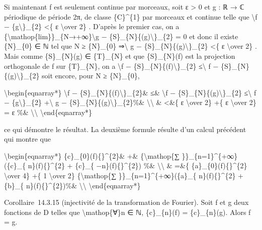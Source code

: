 \documentclass[]{article}
\begin{document}
Si maintenant f est seulement continue par morceaux, soit ε
\textgreater{} 0 et g : ℝ → ℂ périodique de période 2π, de classe
\{C\}\^{}\{1\} par morceaux et continue telle que
\textbackslash{}\textbar{}f − \{g\textbackslash{}\textbar{}\}\_\{2\}
\textless{}\{ ε \textbackslash{}over 2\} . D'après le premier cas, on a
\{\textbackslash{}mathop\{lim\}\}\_\{N→+∞\}\textbackslash{}\textbar{}g −
\{S\}\_\{N\}\{(g)\textbackslash{}\textbar{}\}\_\{2\} = 0 et donc il
existe \{N\}\_\{0\} ∈ ℕ tel que N ≥ \{N\}\_\{0\}
⇒\textbackslash{}\textbar{} g −
\{S\}\_\{N\}\{(g)\textbackslash{}\textbar{}\}\_\{2\} \textless{}\{ ε
\textbackslash{}over 2\} . Mais comme \{S\}\_\{N\}(g) ∈ \{T\}\_\{N\} et
que \{S\}\_\{N\}(f) est la projection orthogonale de f sur \{T\}\_\{N\},
on a \textbackslash{}\textbar{}f −
\{S\}\_\{N\}\{(f)\textbackslash{}\textbar{}\}\_\{2\}
≤\textbackslash{}\textbar{} f −
\{S\}\_\{N\}\{(g)\textbackslash{}\textbar{}\}\_\{2\} soit encore, pour N
≥ \{N\}\_\{0\},

\textbackslash{}begin\{eqnarray*\} \textbackslash{}\textbar{}f −
\{S\}\_\{N\}\{(f)\textbackslash{}\textbar{}\}\_\{2\}\& ≤\&
\textbackslash{}\textbar{}f −
\{S\}\_\{N\}\{(g)\textbackslash{}\textbar{}\}\_\{2\}
≤\textbackslash{}\textbar{} f − \{g\textbackslash{}\textbar{}\}\_\{2\}
+\textbackslash{}\textbar{} g −
\{S\}\_\{N\}\{(g)\textbackslash{}\textbar{}\}\_\{2\}\%\&
\textbackslash{}\textbackslash{} \& \textless{}\&\{ ε
\textbackslash{}over 2\} +\{ ε \textbackslash{}over 2\} = ε \%\&
\textbackslash{}\textbackslash{} \textbackslash{}end\{eqnarray*\}

ce qui démontre le résultat. La deuxième formule résulte d'un calcul
précédent qui montre que

\textbackslash{}begin\{eqnarray*\}
\textbar{}\{c\}\_\{0\}(f)\{\textbar{}\}\^{}\{2\}\& +\&
\{\textbackslash{}mathop\{∑ \}\}\_\{n=1\}\^{}\{+∞\}(\textbar{}\{c\}\_\{
n\}(f)\{\textbar{}\}\^{}\{2\} + \textbar{}\{c\}\_\{
−n\}(f)\{\textbar{}\}\^{}\{2\}) \%\& \textbackslash{}\textbackslash{} \&
=\&\{ \textbar{}\{a\}\_\{0\}(f)\{\textbar{}\}\^{}\{2\}
\textbackslash{}over 4\} +\{ 1 \textbackslash{}over 2\}
\{\textbackslash{}mathop\{∑ \}\}\_\{n=1\}\^{}\{+∞\}(\textbar{}\{a\}\_\{
n\}(f)\{\textbar{}\}\^{}\{2\} + \textbar{}\{b\}\_\{
n\}(f)\{\textbar{}\}\^{}\{2\})\%\& \textbackslash{}\textbackslash{}
\textbackslash{}end\{eqnarray*\}

Corollaire~14.3.15 (injectivité de la transformation de Fourier). Soit f
et g deux fonctions de D telles que \textbackslash{}mathop\{∀\}n ∈ ℕ,
\{c\}\_\{n\}(f) = \{c\}\_\{n\}(g). Alors f = g.
\end{document}
